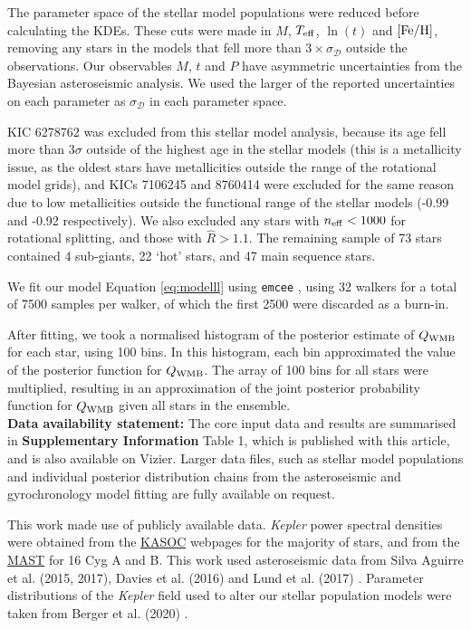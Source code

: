 \documentclass[12pt]{article}
\newcommand{\teff}{\mbox{$T_{\rm eff}$}\xspace}
\newcommand{\feh}{\mbox{$\rm{[Fe/H]}$}\xspace}
\newcommand{\kepler}{\emph{Kepler}\xspace}
\begin{document}
The parameter space of the stellar model populations were reduced before calculating the KDEs. These cuts were made in $M$, $\teff$, $\ln(t)$ and \feh, removing any stars in the models that fell more than $3 \times \sigma_{\mathcal{D}}$ outside the observations. Our observables $M$, $t$ and $P$ have asymmetric uncertainties from the Bayesian asteroseismic analysis. We used the larger of the reported uncertainties on each parameter as $\sigma_{\mathcal{D}}$ in each parameter space. 

KIC 6278762 was excluded from this stellar model analysis, because its age fell more than $3\sigma$ outside of the highest age in the stellar models (this is a metallicity issue, as the oldest stars have metallicities outside the range of the rotational model grids), and KICs 7106245 and 8760414 were excluded for the same reason due to low metallicities outside the functional range of the stellar models (-0.99 and -0.92 respectively). We also excluded any stars with $n_{\rm eff} < 1000$ for rotational splitting, and those with $\hat{R} > 1.1$. The remaining sample of 73 stars contained 4 sub-giants, 22 `hot' stars, and 47 main sequence stars.

We fit our model Equation \ref{eq:modelll} using \texttt{emcee} \cite{foreman-mackey+2013, foreman-mackey2016}, using 32 walkers for a total of 7500 samples per walker, of which the first 2500 were discarded as a burn-in.

After fitting, we took a normalised histogram of the posterior estimate of $Q_{\rm WMB}$ for each star, using 100 bins. In this histogram, each bin approximated the value of the posterior function for $Q_{\rm WMB}$. The array of 100 bins for all stars were multiplied, resulting in an approximation of the joint posterior probability function for $Q_{\rm WMB}$ given all stars in the ensemble.\\



\textbf{Data availability statement:} The core input data and results are summarised in  \textbf{Supplementary Information} Table 1, which is published with this article, and is also available on Vizier. Larger data files, such as stellar model populations and individual posterior distribution chains from the asteroseismic and gyrochronology model fitting are fully available on request.

This work made use of publicly available data. \kepler power spectral densities were obtained from the \href{http://kasoc.phys.au.dk/}{KASOC} webpages for the majority of stars, and from the \href{https://archive.
	stsci.edu/prepds/kepseismic/}{MAST} for 16 Cyg A and B. This work used asteroseismic data from Silva Aguirre et al. (2015, 2017), Davies et al. (2016) and Lund et al. (2017) \cite{silvaaguirre+2015, silvaaguirre+2017, davies+2016, lund+2017}. Parameter distributions of the \kepler field used to alter our stellar population models were taken from Berger et al. (2020) \cite{berger+2020}.\\
\end{document}
